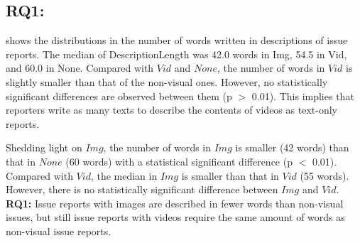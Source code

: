 % 



\subsection*{RQ1: \RQone{}}

 shows the distributions in the number of words written in descriptions of issue reports. The median of DescriptionLength was 42.0 words in Img, 54.5 in Vid, and 60.0 in None. 
Compared with $Vid$ and $None$, the number of words in $Vid$ is slightly smaller than that of the non-visual ones. However, no statistically significant differences are observed between them (p $>$ 0.01). This implies that reporters write as many texts to describe the contents of videos as text-only reports. 

Shedding light on $Img$, the number of words in $Img$ is smaller (42 words) than 
that in $None$ (60 words) with a statistical significant difference (p $<$ 0.01). 
Compared with $Vid$, the median in $Img$ is smaller than that in $Vid$ (55 words). 
However, there is no statistically significant difference between $Img$ and $Vid$.%
\summarybox
{
{\bf RQ1: }{Issue reports with images are described in fewer words than non-visual issues, but still issue reports with videos require the same amount of words as non-visual issue reports. 
}}

